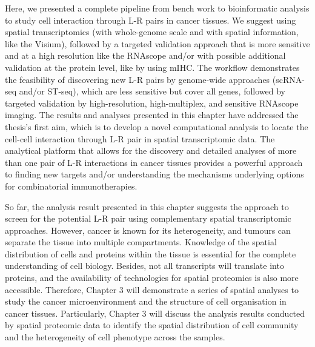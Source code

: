 Here, we presented a complete pipeline from bench work to bioinformatic analysis to study cell interaction through L-R pairs in cancer tissues. We suggest using spatial transcriptomics (with whole-genome scale and with spatial information, like the Visium), followed by a targeted validation approach that is more sensitive and at a high resolution like the RNAscope and/or with possible additional validation at the protein level, like by using mIHC. The workflow demonstrates the feasibility of discovering new L-R pairs by genome-wide approaches (scRNA-seq and/or ST-seq), which are less sensitive but cover all genes, followed by targeted validation by high-resolution, high-multiplex, and sensitive RNAscope imaging. The results and analyses presented in this chapter have addressed the thesis's first aim, which is to develop a novel computational analysis to locate the cell-cell interaction through L-R pair in spatial transcriptomic data.  The analytical platform that allows for the discovery and detailed analyses of more than one pair of L-R interactions in cancer tissues provides a powerful approach to finding new targets and/or understanding the mechanisms underlying options for combinatorial immunotherapies. 

So far, the analysis result presented in this chapter suggests the approach to screen for the potential L-R pair using complementary spatial transcriptomic approaches.  However, cancer is known for its heterogeneity, and tumours can separate the tissue into multiple compartments. Knowledge of the spatial distribution of cells and proteins within the tissue is essential for the complete understanding of cell biology. Besides, not all transcripts will translate into proteins, and the availability of technologies for spatial proteomics is also more accessible. Therefore, Chapter 3 will demonstrate a series of spatial analyses to study the cancer microenvironment and the structure of cell organisation in cancer tissues.  Particularly, Chapter 3 will discuss the analysis results conducted by spatial proteomic data to identify the spatial distribution of cell community and the heterogeneity of cell phenotype across the samples. 

\typeout{}

% 

% 